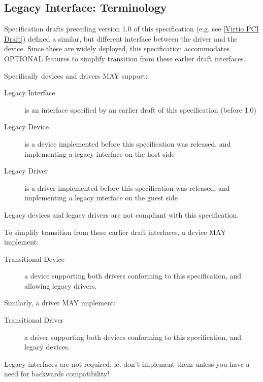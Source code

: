 \subsection{Legacy Interface: Terminology}\label{intro:Legacy
Interface: Terminology}

Specification drafts preceding version 1.0 of this specification
(e.g. see \hyperref[intro:Virtio PCI Draft]{[Virtio PCI Draft]})
defined a similar, but different
interface between the driver and the device.
Since these are widely deployed, this specification
accommodates OPTIONAL features to simplify transition
from these earlier draft interfaces.

Specifically devices and drivers MAY support:
\begin{description}
\item[Legacy Interface]
        is an interface specified by an earlier draft of this specification
        (before 1.0)
\item[Legacy Device]
        is a device implemented before this specification was released,
        and implementing a legacy interface on the host side
\item[Legacy Driver]
        is a driver implemented before this specification was released,
        and implementing a legacy interface on the guest side
\end{description}

Legacy devices and legacy drivers are not compliant with this
specification.

To simplify transition from these earlier draft interfaces,
a device MAY implement:

\begin{description}
\item[Transitional Device]
        a device supporting both drivers conforming to this
        specification, and allowing legacy drivers.
\end{description}

Similarly, a driver MAY implement:
\begin{description}
\item[Transitional Driver]
        a driver supporting both devices conforming to this
        specification, and legacy devices.
\end{description}

\begin{note}
  Legacy interfaces are not required; ie. don't implement them unless you
  have a need for backwards compatibility!
\end{note}


